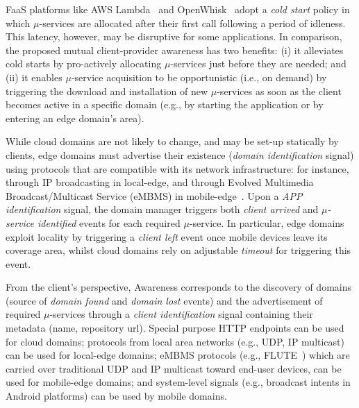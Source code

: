FaaS platforms like AWS Lambda~\cite{AWSLambda}
and OpenWhisk~\cite{OpenWhisk} adopt a \textit{cold start} policy in which $\mu$-services are allocated after their first call following a period of idleness. This latency, however, may be disruptive for some applications. In comparison, the proposed mutual client-provider awareness 
has two benefits: (i) it alleviates cold starts by pro-actively allocating $\mu$-services just before they are needed; and (ii) it enables $\mu$-service acquisition to be opportunistic (i.e., on demand) by triggering the download and installation of new $\mu$-services as soon as the client becomes active in a specific domain (e.g., by starting the application or by entering an edge domain's area).

While cloud domains are not likely to change, and may be set-up statically by clients,
edge domains must advertise their existence (\textit{domain identification} signal) using protocols that are compatible with its network infrastructure: for instance, through IP broadcasting in local-edge, and through Evolved Multimedia Broadcast/Multicast Service (eMBMS) in mobile-edge~\cite{lecompte2012evolved,etsimec16:03}. Upon a \textit{APP identification} signal, the domain manager triggers both \textit{client arrived} and \textit{$\mu$-service identified} events for each required $\mu$-service. In particular, edge domains exploit locality by triggering a \textit{client left} event once mobile devices leave its coverage area, whilst cloud domains rely on adjustable \textit{timeout} for triggering this event.


%	
%	

From the client's perspective, Awareness corresponds to the discovery of domains (source of \textit{domain found} and \textit{domain lost} events) and the advertisement of required $\mu$-services through a \textit{client identification} signal containing their metadata (name, repository url). Special purpose HTTP endpoints can be used for cloud domains; protocols from local area networks (e.g., UDP, IP multicast) can be used for local-edge domains; eMBMS protocols (e.g., FLUTE~\cite{lecompte2012evolved}) which are carried over traditional UDP and IP multicast toward end-user devices, can be used for mobile-edge domains; and system-level signals (e.g., broadcast intents in Android platforms) can be used by mobile domains.

